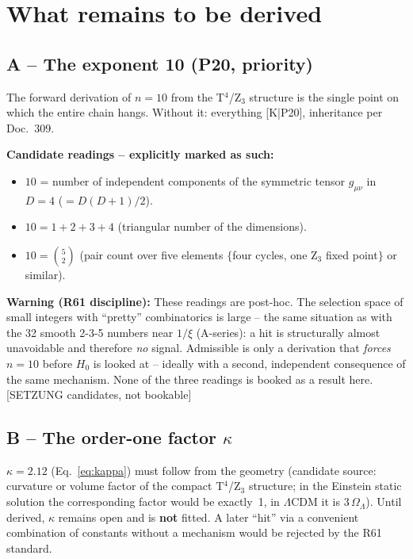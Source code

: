 \chapter{What remains to be derived}
\label{ch:pflichten}

\section{A -- The exponent 10 (P20, priority)}

The forward derivation of $n=10$ from the T$^4$/Z$_3$ structure is
the single point on which the entire chain hangs. Without it:
everything [K|P20], inheritance per Doc.~309.

\textbf{Candidate readings -- explicitly marked as such:}
\begin{itemize}
  \item $10$ = number of independent components of the symmetric
        tensor $g_{\mu\nu}$ in $D=4$ ($= D(D{+}1)/2$).
  \item $10 = 1+2+3+4$ (triangular number of the dimensions).
  \item $10 = \binom{5}{2}$ (pair count over five elements
        $\{$four cycles, one Z$_3$ fixed point$\}$ or similar).
\end{itemize}

\textbf{Warning (R61 discipline):} These readings are post-hoc. The
selection space of small integers with \enquote{pretty}
combinatorics is large -- the same situation as with the 32 smooth
2-3-5 numbers near $1/\xi$ (A-series): a hit is structurally almost
unavoidable and therefore \emph{no} signal. Admissible is only a
derivation that \emph{forces} $n=10$ before $H_0$ is looked at --
ideally with a second, independent consequence of the same
mechanism. None of the three readings is booked as a result here.
[SETZUNG candidates, not bookable]

\section{B -- The order-one factor $\kappa$}

$\kappa = 2.12$ (Eq.~\eqref{eq:kappa}) must follow from the
geometry (candidate source: curvature or volume factor of the
compact T$^4$/Z$_3$ structure; in the Einstein static solution the
corresponding factor would be exactly~1, in $\Lambda$CDM it is
$3\,\Omega_\Lambda$). Until derived, $\kappa$ remains open and is
\textbf{not} fitted. A later \enquote{hit} via a convenient
combination of constants without a mechanism would be rejected by
the R61 standard.

